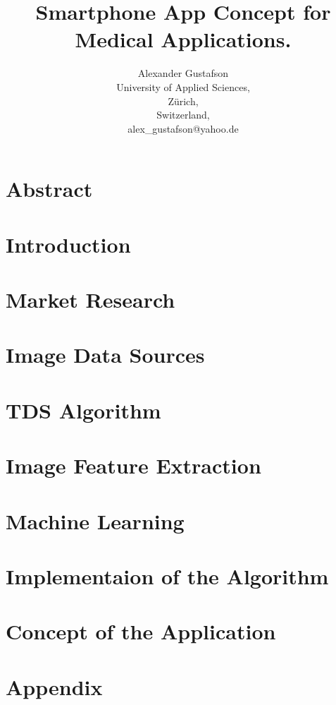 \documentclass{report}
\title{Smartphone App Concept for Medical Applications.}
\author{Alexander Gustafson\\
  University of Applied Sciences,\\
  Zürich,\\
  Switzerland,\\
  alex\_gustafson@yahoo.de}
\date{\parbox{\linewidth}{\centering%
  \today\endgraf\bigskip
  Dozent: Reto Knaack (knaa@zhaw.ch)\endgraf\bigskip
  School of Engineering, Abteilung Zürich \endgraf
  Studiengang Informatik\endgraf
  }}
\begin{document}
\maketitle

\chapter*{Abstract}


\tableofcontents

\chapter{Introduction}



\chapter{Market Research}


\chapter{Image Data Sources}


\chapter{TDS Algorithm}


\chapter{Image Feature Extraction}


\chapter{Machine Learning}


\chapter{Implementaion of the Algorithm}


\chapter{Concept of the Application}


{}


\chapter{Appendix}

\end{document}
